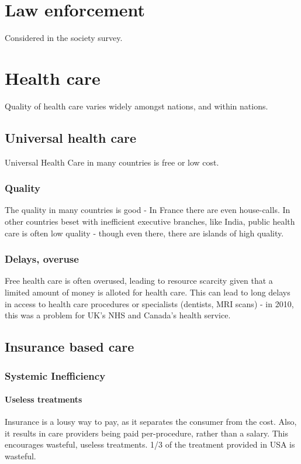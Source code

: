 \documentclass[oneside, article]{memoir}
\begin{document}
\section{Law enforcement}
Considered in the society survey.

\section{Health care}
Quality of health care varies widely amongst nations, and within nations.

\subsection{Universal health care}
Universal Health Care in many countries is free or low cost. 

\subsubsection{Quality}
The quality in many countries is good - In France there are even house-calls. In other countries beset with inefficient executive branches, like India, public health care is often low quality - though even there, there are islands of high quality.

\subsubsection{Delays, overuse}
Free health care is often overused, leading to resource scarcity given that a limited amount of money is alloted for health care. This can lead to long delays in access to health care procedures or specialists (dentists, MRI scans) - in 2010, this was a problem for UK's NHS and Canada's health service.

\subsection{Insurance based care}
\subsubsection{Systemic Inefficiency}
\paragraph{Useless treatments}
Insurance is a lousy way to pay, as it separates the consumer from the cost. Also, it results in care providers being paid per-procedure, rather than a salary. This encourages wasteful, useless treatments. 1/3 of the treatment provided in USA is wasteful.
\end{document}
